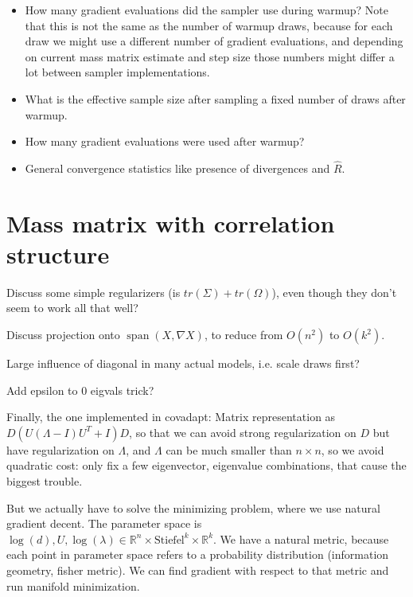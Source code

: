 \documentclass{scrartcl}
\DeclareMathOperator{\vecSpan}{span}
\begin{document}
\begin{itemize}
\item How many gradient evaluations did the sampler use during warmup? Note
that this is not the same as the number of warmup draws, because for each
draw we might use a different number of gradient evaluations, and depending
on current mass matrix estimate and step size those numbers might differ a lot
between sampler implementations.

\item What is the effective sample size after sampling a fixed number of draws
after warmup.

\item How many gradient evaluations were used after warmup?

\item General convergence statistics like presence of divergences and $\hat{R}$.
\end{itemize}



\section{Mass matrix with correlation structure}

Discuss some simple regularizers (is $tr(\Sigma) + tr(\Omega)$), even though
they don't seem to work all that well?

Discuss projection onto $\vecSpan(X, \nabla X)$, to reduce from $O(n^2)$ to $O(k^2)$.

Large influence of diagonal in many actual models, i.e. scale draws first?

Add epsilon to 0 eigvals trick?

Finally, the one implemented in covadapt: Matrix representation as $D(U(\Lambda
- I)U^T + I)D$, so that we can avoid strong regularization on $D$ but have
regularization on $\Lambda$, and $\Lambda$ can be much smaller than $n\times
n$, so we avoid quadratic cost: only fix a few eigenvector, eigenvalue
combinations, that cause the biggest trouble.

But we actually have to solve the minimizing problem, where we use natural
gradient decent. The parameter space is $\log(d), U, \log(\lambda) \in \mathbb{R}^n
\times \text{Stiefel}^k \times \mathbb{R}^k$. We have a natural metric, because each
point in parameter space refers to a probability distribution (information
geometry, fisher metric). We can find gradient with respect to that metric and
run manifold minimization.
\end{document}
